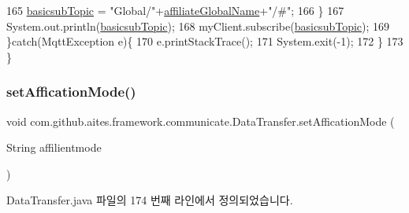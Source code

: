 \begin{DoxyCode}
165                  \mbox{\hyperlink{classcom_1_1github_1_1aites_1_1framework_1_1communicate_1_1_data_transfer_a0b644afb1ba2329f302a84a4ca2b8343}{basicsubTopic}} = \textcolor{stringliteral}{"Global/"}+\mbox{\hyperlink{classcom_1_1github_1_1aites_1_1framework_1_1communicate_1_1_data_transfer_a5333e287369f5f20c62e28cd80fe0398}{affiliateGlobalName}}+\textcolor{stringliteral}{"/#"};
166              \}
167              System.out.println(\mbox{\hyperlink{classcom_1_1github_1_1aites_1_1framework_1_1communicate_1_1_data_transfer_a0b644afb1ba2329f302a84a4ca2b8343}{basicsubTopic}});
168              myClient.subscribe(\mbox{\hyperlink{classcom_1_1github_1_1aites_1_1framework_1_1communicate_1_1_data_transfer_a0b644afb1ba2329f302a84a4ca2b8343}{basicsubTopic}});
169         \}\textcolor{keywordflow}{catch}(MqttException e)\{
170              e.printStackTrace();
171              System.exit(-1);
172         \}
173     \}
\end{DoxyCode}
\mbox{\label{classcom_1_1github_1_1aites_1_1framework_1_1communicate_1_1_data_transfer_a458adf74b705679f6c70a746e729b449}} 
\subsubsection{\texorpdfstring{set\+Affication\+Mode()}{setAfficationMode()}}
{\footnotesize\ttfamily void com.\+github.\+aites.\+framework.\+communicate.\+Data\+Transfer.\+set\+Affication\+Mode (\begin{DoxyParamCaption}\item[{String}]{affilientmode }\end{DoxyParamCaption})}



Data\+Transfer.\+java 파일의 174 번째 라인에서 정의되었습니다.



